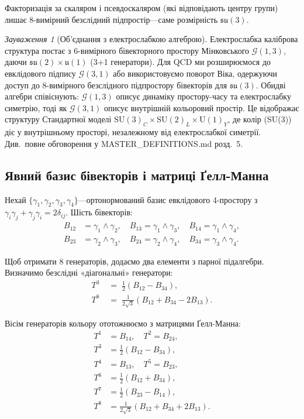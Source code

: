 \documentclass[11pt,a4paper]{article}
\newcommand{\Cl}{\mathcal{G}}
\newcommand{\SU}{\mathrm{SU}}
\newcommand{\UU}{\mathrm{U}}
\theoremstyle{definition}
\theoremstyle{plain}
\theoremstyle{remark}
\newtheorem{remark}{Зауваження}[section]
\begin{document}
Факторизація за скаляром і псевдоскаляром (які відповідають центру групи) лишає 8-вимірний безслідний підпростір—саме розмірність $\mathfrak{su}(3)$.

\begin{remark}[Об'єднання з електрослабкою алгеброю]
Електрослабка каліброва структура постає з 6-вимірного бівекторного простору Мінковського $\Cl(1,3)$, даючи $\mathfrak{su}(2) \times \mathfrak{u}(1)$ (3+1 генератори). Для QCD ми розширюємося до евклідового підпису $\Cl(3,1)$ або використовуємо поворот Віка, одержуючи доступ до 8-вимірного безслідного підпростору бівекторів для $\mathfrak{su}(3)$. Обидві алгебри співіснують: $\Cl(1,3)$ описує динаміку простору-часу та електрослабку симетрію, тоді як $\Cl(3,1)$ описує внутрішній кольоровий простір. Це відображає структуру Стандартної моделі $\SU(3)_C \times \SU(2)_L \times \UU(1)_Y$, де колір (SU(3)) діє у внутрішньому просторі, незалежному від електрослабкої симетрії. Див.\ повне обговорення у MASTER\_DEFINITIONS.md розд.\ 5.
\end{remark}

\subsection{Явний базис бівекторів і матриці Ґелл-Манна}

Нехай $\{\gamma_1,\gamma_2,\gamma_3,\gamma_4\}$—ортонормований базис евклідового 4-простору з $\gamma_i\gamma_j+\gamma_j\gamma_i=2\delta_{ij}$. Шість бівекторів:
\begin{equation}
\begin{aligned}
B_{12}&=\gamma_1\wedge\gamma_2,\quad B_{13}=\gamma_1\wedge\gamma_3,\quad B_{14}=\gamma_1\wedge\gamma_4,\\
B_{23}&=\gamma_2\wedge\gamma_3,\quad B_{24}=\gamma_2\wedge\gamma_4,\quad B_{34}=\gamma_3\wedge\gamma_4.
\end{aligned}
\label{eq:bivector-basis-6d}
\end{equation}

Щоб отримати 8 генераторів, додаємо два елементи з парної підалгебри. Визначимо безслідні «діагональні» генератори:
\begin{align}
T^3 &\;=\; \frac{1}{2}(B_{12}-B_{34}), \\
T^8 &\;=\; \frac{1}{2\sqrt{3}}(B_{12}+B_{34}-2B_{13}).
\end{align}

Вісім генераторів кольору ототожнюємо з матрицями Ґелл-Манна:
\begin{align}
T^1 &= B_{14}, \quad T^2 = B_{24}, \nonumber \\
T^3 &= \frac{1}{2}(B_{12} - B_{34}), \nonumber \\
T^4 &= B_{13}, \quad T^5 = B_{23}, \nonumber \\
T^6 &= \frac{1}{2}(B_{12} + B_{34}), \nonumber \\
T^7 &= \frac{1}{2}(B_{23} - B_{14}), \nonumber \\
T^8 &= \frac{1}{2\sqrt{3}}(B_{12} + B_{34} + 2B_{13}).
\label{eq:color-generators}
\end{align}
\end{document}
